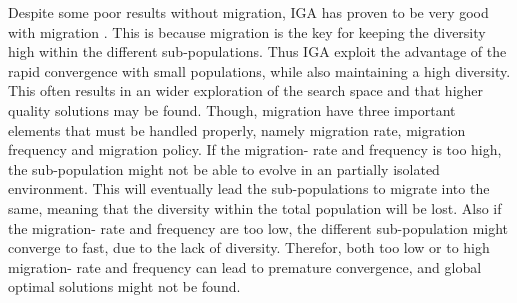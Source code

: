 Despite some poor results without migration, IGA has proven to be very good with migration \cite{IGA:DGA-optimization-of-wind-farm, IGA:attribute-reduction, IGA:Corcoran, IGA:fully-connected-vs-ring-buildings, IGA:non-linear-optimization-problem}. This is because migration is the key for keeping the diversity high within the different sub-populations. Thus IGA exploit the advantage of the rapid convergence with small populations, while also maintaining a high diversity. This often results in an wider exploration of the search space and that higher quality solutions may be found. Though, migration have three important elements that must be handled properly, namely migration rate, migration frequency and migration policy. If the migration- rate and frequency is too high, the sub-population might not be able to evolve in an partially isolated environment. This will eventually lead the sub-populations to migrate into the same, meaning that the diversity within the total population will be lost. Also if the migration- rate and frequency are too low, the different sub-population might converge to fast, due to the lack of diversity. Therefor, both too low or to high migration- rate and frequency can lead to premature convergence, and global optimal solutions might not be found. 

